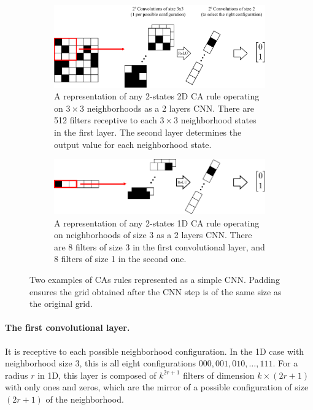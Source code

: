 \begin{figure}[htbp]
  \centering
  \begin{subfigure}[b]{\linewidth}
    \centering
  \includegraphics[width=.9\linewidth]{figures/global_schema}
  \caption{\label{fig:global_schema}A representation of any 2-states 2D CA rule
    operating on $3\times 3$ neighborhoods as a 2 layers CNN. There are 512 filters
    receptive to each $3\times 3$ neighborhood states in the first layer. The second
    layer determines the output value for each neighborhood state.}
  \end{subfigure}
  \begin{subfigure}[b]{\linewidth}
    \centering
  \includegraphics[width=.9\linewidth]{figures/one_d_global_schema}
  \caption{\label{fig:one_d_global_schema}A representation of any 2-states 1D CA
    rule operating on neighborhoods of size 3 as a 2 layers CNN. There are 8
    filters of size 3 in the first convolutional layer, and 8 filters of size 1
    in the second one.}
  \end{subfigure}
  \caption{Two examples of \acp{CA} rules represented as a simple CNN. Padding
    ensures the grid obtained after the CNN step is of the same size as the
    original grid.}\label{fig:ca_cnn_2dims}
\end{figure}


\paragraph{The first convolutional layer.} It is receptive to each possible
neighborhood configuration. In the 1D case with neighborhood size 3, this is all
eight configurations $000, 001, 010, \ldots, 111$. For a radius $r$ in 1D, this layer
is composed of $k^{2r + 1}$ filters of dimension $k \times (2r + 1)$ with only ones
and zeros, which are the mirror of a possible configuration of size $(2r+1)$ of
the neighborhood.

